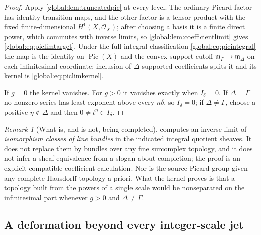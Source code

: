 \documentclass[11pt,letterpaper]{article}
\theoremstyle{definition}
\theoremstyle{remark}
\newtheorem{remark}[remark]{Remark}
\newcommand{\OO}{\mathcal O}
\newcommand{\mK}{\mathfrak m_\Gamma}
\newcommand{\Pic}{\operatorname{Pic}}
\numberwithin{equation}{section}
\begin{document}
\begin{proof}
Apply \cref{global:lem:truncatedpic} at every level. The ordinary Picard factor has identity transition maps, and the other factor is a tensor product with the fixed finite-dimensional $H^1(X,\OO_X)$; after choosing a basis it is a finite direct power, which commutes with inverse limits, so \cref{global:lem:coefficientlimit} gives \eqref{global:eq:piclimtarget}. Under the full integral classification \eqref{global:eq:picintegral} the map is the identity on $\Pic(X)$ and the convex-support cutoff $\mK\to\mathfrak m_\Delta$ on each infinitesimal coordinate; inclusion of $\Delta$-supported coefficients splits it and its kernel is \eqref{global:eq:piclimkernel}.

If $g=0$ the kernel vanishes. For $g>0$ it vanishes exactly when $I_\delta=0$. If $\Delta=\Gamma$ no nonzero series has least exponent above every $n\delta$, so $I_\delta=0$; if $\Delta\ne\Gamma$, choose a positive $\eta\notin\Delta$ and then $0\ne t^\eta\in I_\delta$.
\end{proof}

\begin{remark}[What is, and is not, being completed]\label{global:rem:whatcompleted}
 computes an inverse limit of \emph{isomorphism classes of line bundles} in the indicated integral quotient sheaves. It does not replace them by bundles over any fine surcomplex topology, and it does not infer a sheaf equivalence from a slogan about completion; the proof is an explicit compatible-coefficient calculation. Nor is the source Picard group given any complete Hausdorff topology a priori. What the kernel proves is that a topology built from the powers of a single scale would be nonseparated on the infinitesimal part whenever $g>0$ and $\Delta\ne\Gamma$.
\end{remark}

\subsection{A deformation beyond every integer-scale jet}
\end{document}
